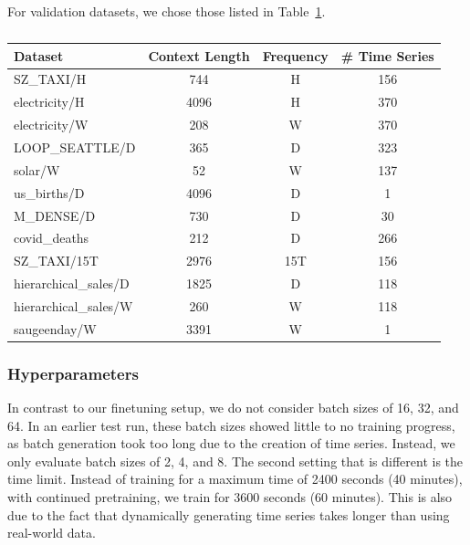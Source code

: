 For validation datasets, we chose those listed in Table~\ref{tab:continued_pretraining_val}.
\begin{table}[h]
\centering
\begin{tabular}{lccc}
\hline
Dataset & Context Length & Frequency & \# Time Series \\
\hline
SZ\_TAXI/H & 744 & H & 156 \\
electricity/H & 4096 & H & 370 \\
electricity/W & 208 & W & 370 \\
LOOP\_SEATTLE/D & 365 & D & 323 \\
solar/W & 52 & W & 137 \\
us\_births/D & 4096 & D & 1 \\
M\_DENSE/D & 730 & D & 30 \\
covid\_deaths & 212 & D & 266 \\
SZ\_TAXI/15T & 2976 & 15T & 156 \\
hierarchical\_sales/D & 1825 & D & 118 \\
hierarchical\_sales/W & 260 & W & 118 \\
saugeenday/W & 3391 & W & 1 \\
\hline
\end{tabular}
\caption{}
\label{tab:continued_pretraining_val}
\end{table}
\subsubsection{Hyperparameters}
In contrast to our finetuning setup, we do not consider batch sizes of 16, 32, and 64.
In an earlier test run, these batch sizes showed little to no training progress, as batch generation took too long due to the creation of time series.
Instead, we only evaluate batch sizes of 2, 4, and 8.
\newline
The second setting that is different is the time limit.
Instead of training for a maximum time of 2400 seconds (40 minutes), with continued pretraining, we train for 3600 seconds (60 minutes).
This is also due to the fact that dynamically generating time series takes longer than using real-world data.
